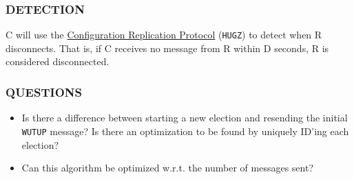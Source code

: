 \subsubsection{DETECTION}

C will use the \hyperref[proto_config]{Configuration Replication Protocol} (\texttt{HUGZ}) to detect when R disconnects.
That is, if C receives no message from R within D seconds, R is considered disconnected.

\subsubsection{QUESTIONS}

\begin{itemize}
\item Is there a difference between starting a new election and resending the initial \texttt{WUTUP} message? Is there
      an optimization to be found by uniquely ID'ing each election?
\item Can this algorithm be optimized w.r.t. the number of messages sent?
\end{itemize}

